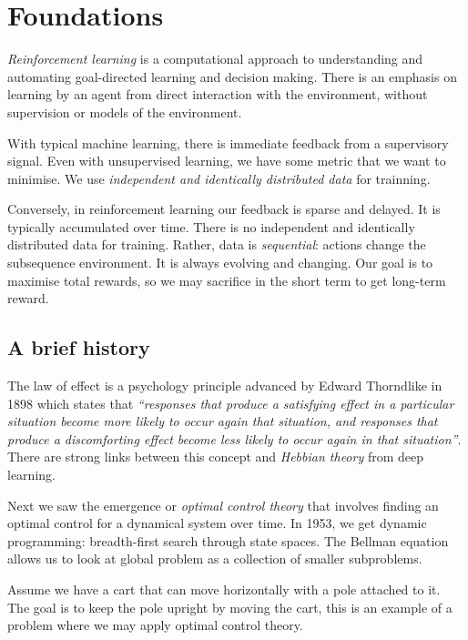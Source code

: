 
\section{Foundations}

\begin{definition}
	\emph{Reinforcement learning} is a computational approach to
	understanding and automating goal-directed learning and decision making.
	There is an emphasis on learning by an agent from direct interaction with
	the environment, without supervision or models of the environment.
\end{definition}

With typical machine learning, there is immediate feedback from a supervisory
signal.
Even with unsupervised learning, we have some metric that we want to minimise.
We use \emph{independent and identically distributed data} for trainning.

Conversely, in reinforcement learning our feedback is sparse and delayed.
It is typically accumulated over time.
There is no independent and identically distributed data for training.
Rather, data is \emph{sequential}: actions change the subsequence
environment. 
It is always evolving and changing.
Our goal is to maximise total rewards, so we may sacrifice in the short term
to get long-term reward.

\subsection{A brief history}

The law of effect is a psychology principle advanced by Edward Thorndlike in
1898 which states that
\emph{``responses that produce a satisfying effect in a particular situation
become more likely to occur again that situation, and responses that produce
a discomforting effect become less likely to occur again in that situation''}.
There are strong links between this concept and \emph{Hebbian theory} from
deep learning.

Next we saw the emergence or \emph{optimal control theory} that involves
finding an optimal control for a dynamical system over time.
In 1953, we get dynamic programming: breadth-first search through state spaces.
The Bellman equation allows us to look at global problem as a collection of
smaller subproblems.

\begin{example}
	Assume we have a cart that can move horizontally with a pole attached to it.
	The goal is to keep the pole upright by moving the cart, this is an example
	of a problem where we may apply optimal control theory.
\end{example}

